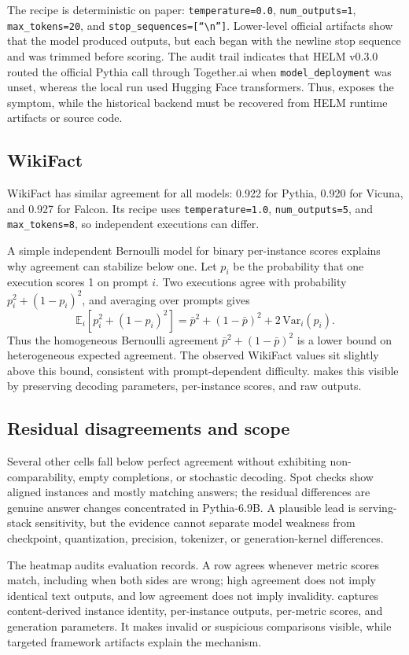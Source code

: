 The recipe is deterministic on paper:
\texttt{temperature=0.0}, \texttt{num\_outputs=1}, \texttt{max\_tokens=20}, and
\texttt{stop\_sequences=[``\textbackslash n'']}. Lower-level official artifacts
show that the model produced outputs, but each began with the newline stop
sequence and was trimmed before scoring. The audit trail indicates that HELM
v0.3.0 routed the official Pythia call through Together.ai when
\texttt{model\_deployment} was unset, whereas the local run used Hugging Face
transformers. Thus, \eee{} exposes the symptom, while the historical backend
must be recovered from HELM runtime artifacts or source code.

\subsection{WikiFact}
\label{sec:app-helm-wikifact}

WikiFact has similar agreement for all models: 0.922 for Pythia, 0.920 for
Vicuna, and 0.927 for Falcon. Its recipe uses \texttt{temperature=1.0},
\texttt{num\_outputs=5}, and \texttt{max\_tokens=8}, so independent executions
can differ.

A simple independent Bernoulli model for binary per-instance scores explains
why agreement can stabilize below one. Let $p_i$ be the probability that one
execution scores 1 on prompt $i$. Two executions agree with probability
$p_i^2 + (1-p_i)^2$, and averaging over prompts gives
\[
  \mathbb{E}_i[p_i^2 + (1-p_i)^2]
  = \bar p^2 + (1-\bar p)^2 + 2\,\mathrm{Var}_i(p_i).
\]
Thus the homogeneous Bernoulli agreement
$\bar p^2 + (1-\bar p)^2$ is a lower bound on heterogeneous expected agreement.
The observed WikiFact values sit slightly above this bound, consistent with
prompt-dependent difficulty. \eee{} makes this visible by preserving decoding
parameters, per-instance scores, and raw outputs.

\subsection{Residual disagreements and scope}
\label{sec:app-helm-residual}

Several other cells fall below perfect agreement without exhibiting
non-comparability, empty completions, or stochastic decoding. Spot checks show
aligned instances and mostly matching answers; the residual differences are
genuine answer changes concentrated in Pythia-6.9B. A plausible lead is
serving-stack sensitivity, but the evidence cannot separate model weakness from
checkpoint, quantization, precision, tokenizer, or generation-kernel
differences.

The heatmap audits evaluation records. A row agrees whenever metric scores
match, including when both sides are wrong; high agreement does not imply
identical text outputs, and low agreement does not imply invalidity. \eee{}
captures content-derived instance identity, per-instance outputs, per-metric
scores, and generation parameters. It makes invalid or suspicious comparisons
visible, while targeted framework artifacts explain the mechanism.
